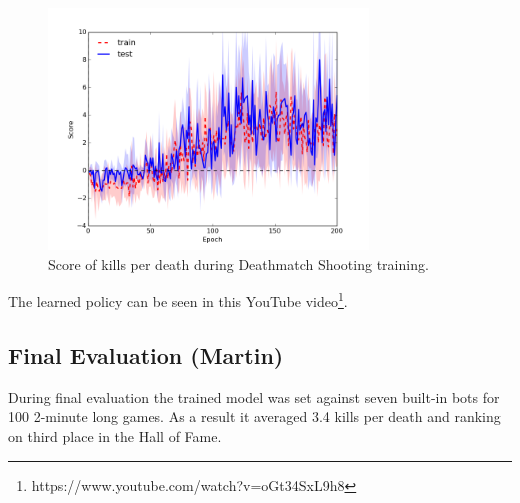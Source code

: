 \documentclass{article}
\begin{document}
\begin{figure}[htb]

\begin{minipage}[b]{1.0\linewidth}
  \centering
  \centerline{\includegraphics[width=8.5cm]{shooting_plot_2}}
\end{minipage}
\caption{Score of kills per death during Deathmatch Shooting training.
}
\label{fig:basic-dqn}
%
\end{figure}

The learned policy can be seen in this YouTube video\footnote{https://www.youtube.com/watch?v=oGt34SxL9h8}.


%

\subsection{Final Evaluation (Martin)}
During final evaluation the trained model was set against seven built-in bots for 100 2-minute long games. As a result it averaged 3.4 kills per death and ranking on third place in the Hall of Fame.
\end{document}
